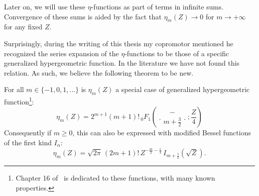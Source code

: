 Later on, we will use these $\eta$-functions as part of terms in infinite sums. Convergence of these sums is aided by the fact that $\eta_m(Z) \to 0$ for $m \to + \infty$ for any fixed $Z$.

Surprisingly, during the writing of this thesis my copromotor mentioned he recognized the series expansion of the $\eta$-functions to be those of a specific generalized hypergeometric function. In the literature we have not found this relation. As such, we believe the following theorem to be new.

\begin{theorem} For all $m \in \{-1, 0, 1, \dots\}$ is $\eta_m(Z)$ a special case of generalized hypergeometric function\footnote{Chapter 16 of~\cite{nist_dlmf} is dedicated to these functions, with many known properties.}:
    \begin{equation}\label{equ:c4_eta_as_hypergeometric}
        \eta_m(Z) = 2^{m+1}(m+1)!\, {}_0F_1\left(\genfrac..{0pt}{}{ - }{m+\frac{3}{2}}; \frac{Z}{4}\right)
    \end{equation}
    Consequently if $m \geq 0$, this can also be expressed with modified Bessel functions of the first kind $I_\alpha$:
    $$
        \eta_m(Z) = \sqrt{2\pi} \,(2m+1)! \, Z^{-\frac{m}{2} - \frac{1}{4}} \, I_{m + \frac{1}{2}}\left(\sqrt{Z}\right)\text{.}
    $$
\end{theorem}

